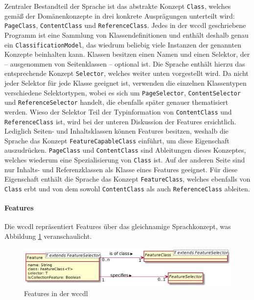     Zentraler Bestandteil der Sprache ist das abstrakte Konzept \texttt{Class},
    welches gemäß der Domänenkonzepte in drei konkrete Ausprägungen unterteilt wird:
    \texttt{PageClass}, \texttt{ContentClass} und \texttt{ReferenceClass}.
    Jedes in der \gls{wccdl} geschriebene Programm ist eine Sammlung
    von Klassendefinitionen und enthält deshalb genau ein \texttt{ClassificationModel},
    das wiedrum beliebig viele Instanzen der genannten Konzepte beinhalten kann.
    Klassen besitzen einen Namen und einen Selektor,
    der -- ausgenommen von Seitenklassen -- optional ist.
    Die Sprache enthält hierzu das entsprechende Konzept \texttt{Selector},
    welches weiter unten vorgestellt wird.
    Da nicht jeder Selektor für jede Klasse geeignet ist,
    verwenden die einzelnen Klassentypen verschiedene Selektortypen,
    wobei es sich um \texttt{PageSelector}, \texttt{ContentSelector}
    und \texttt{ReferenceSelector} handelt,
    die ebenfalls später genauer thematisiert werden.
    Wieso der Selektor Teil der Typinformation von \texttt{ContentClass}
    und \texttt{ReferenceClass} ist,
    wird bei der unteren Diskussion der Features ersichtlich.
    Lediglich Seiten- und Inhaltsklassen können Features besitzen,
    weshalb die Sprache das Konzept \texttt{FeatureCapableClass} einführt,
    um diese Eigenschaft auszudrücken.
    \texttt{PageClass} und \texttt{ContentClass} sind
    Ableitungen dieses Konzeptes, welches
    wiederum eine Spezialisierung von \texttt{Class} ist.
    Auf der anderen Seite sind nur Inhalts- und Referenzklassen als Klasse eines Features geeignet.
    Für diese Eigenschaft enthält die Sprache das Konzept \texttt{FeatureClass},
    welches ebenfalls von \texttt{Class} erbt und
    von dem sowohl \texttt{ContentClass} als auch \texttt{ReferenceClass} ableiten.

    \paragraph{Features}
    Die \gls{wccdl} repräsentiert Features über das gleichnamige Sprachkonzept,
    was Abbildung \ref{image:dslFeatures} veranschaulicht.

    \begin{figure}[htb]
        \centering
        \includegraphics[scale=\imageScalingFactor]{../resources/dsl/features.png}
        \caption{Features in der \acrshort{wccdl}}
        \label{image:dslFeatures}
    \end{figure}

